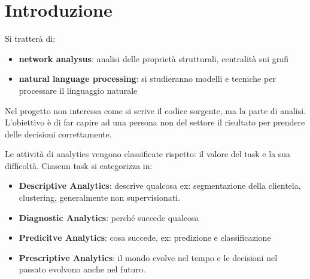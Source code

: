 \chapter{Introduzione}
Si tratterà di:
\begin{itemize}
    \item \textbf{network analysus}: analisi delle proprietà strutturali, centralità sui 
    grafi
    \item \textbf{natural language processing}: si studieranno modelli e tecniche per 
    processare il linguaggio naturale
\end{itemize}
Nel progetto non interessa come si scrive il codice sorgente, ma la parte di analisi.
L'obiettivo è di far capire ad una persona non del settore il risultato per prendere
delle decisioni correttamente.

Le attività di analytics vengono classificate rispetto: il valore del task e la 
sua difficoltà. Ciascun task si categorizza in:
\begin{itemize}
    \item \textbf{Descriptive Analytics}: descrive qualcosa ex: segmentazione della clientela, clustering, generalmente 
    non supervisionati. 
    \item \textbf{Diagnostic Analytics}: perché succede qualcosa
    \item \textbf{Predicitve Analytics}: cosa succede, ex: predizione e classificazione
    \item \textbf{Prescriptive Analytics}: il mondo evolve nel tempo e le decisioni nel 
    passato evolvono anche nel futuro.
\end{itemize} 

